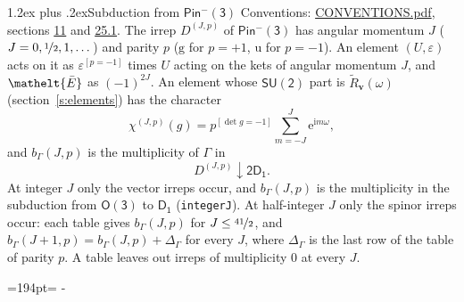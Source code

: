 \documentclass[10pt,a4paper]{article}
\makeatletter
\renewcommand\section{\@startsection{section}{1}{\z@}{-3ex plus -1ex minus -.2ex}%
  {1.2ex plus .2ex}{\normalfont\large\sffamily\bfseries\color{parttitle}}}
\newcommand{\needspace}[1]{\par\penalty-100\begingroup\dimen0=#1\relax\dimen2=\pagegoal
  \advance\dimen2-\pagetotal\ifdim\dimen0>\dimen2\relax\ifdim\dimen2>0pt\vfil\break\fi\fi
  \endgroup}
\numberwithin{equation}{section}
\newcommand{\eltfont}[1]{{\let\sigma\eltsigma\mathelt{#1}}}
\newcommand{\grp}[1]{\mathsf{#1}}
\newcommand{\elt}[1]{\eltfont{#1}}
\newcommand{\ptag}[1]{\mathrm{#1}}
\newcommand{\iverson}[1]{[#1]}
\newcommand{\restr}[2]{#1\!\downarrow#2}
\newcommand{\vv}{\mathbf{v}}
\newcommand{\iunit}{\mathrm{i}}
\newcommand{\expe}{\mathrm{e}}
\newcommand{\irrJp}[2]{D^{(#1,#2)}}
\newcommand{\barred}[1]{\bar{#1}}
\newcommand{\lift}[1]{\tilde{#1}}
\makeatother
\begin{document}
\section{Subduction from \texorpdfstring{$\grp{Pin^{-}(3)}$}{Pin(3)}}\label{s:subduction_parent}
Conventions: \href{../../CONVENTIONS.pdf}{CONVENTIONS.pdf}, sections \href{../../../rotation/CONVENTIONS.pdf\#conv.11}{11} and \href{../../CONVENTIONS.pdf\#conv.25.1}{25.1}.
\leavevmode\label{n:index.J}\label{n:index.parity}\label{n:irrep.o3}The irrep $\irrJp{J}{p}$ of \href{Pinminus3.pdf}{$\grp{Pin^{-}(3)}$} has angular momentum $J$ ($J = 0, \nicefrac{1}{2}, 1, \dots$) and parity $p$ ($\ptag{g}$ for $p = +1$, $\ptag{u}$ for $p = -1$). An element $(U, \varepsilon)$ acts on it as $\varepsilon^{[p = -1]}$ times $U$ acting on the kets of angular momentum $J$, and $\elt{\barred{E}}$ as $(-1)^{2J}$. \label{n:function.character.parent}\label{n:function.multiplicity}An element whose $\grp{SU(2)}$ part is $\lift{R}_{\vv}(\omega)$ (section~\ref{s:elements}) has the character
\begin{equation}\label{e:chi}\chi^{(J,p)}(g) = p^{\iverson{\det g = -1}}\sum_{m=-J}^{J} \expe^{\iunit m\omega},\end{equation}
and $b_\Gamma(J, p)$ is the multiplicity of $\Gamma$ in
\begin{equation}\label{e:parent}\restr{\irrJp{J}{p}}{\grp{2D_{1}}}.\end{equation}
At integer $J$ only the vector irreps occur, and $b_\Gamma(J, p)$ is the multiplicity in the subduction from $\grp{O(3)}$ to \href{../../../rotation/data/pdf/D1.pdf}{$\grp{D_{1}}$} (\texttt{integerJ}). \label{n:index.increment}At half-integer $J$ only the spinor irreps occur: each table gives $b_\Gamma(J, p)$ for $J \le \nicefrac{41}{2}$, and $b_\Gamma(J + 1, p) = b_\Gamma(J, p) + \Delta_\Gamma$ for every $J$, where $\Delta_\Gamma$ is the last row of the table of parity $p$. A table leaves out irreps of multiplicity 0 at every $J$.
\needspace{194pt}
\end{document}
